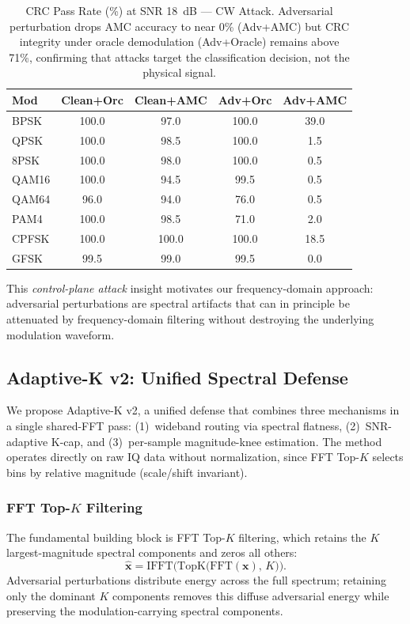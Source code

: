 \begin{table}[t]
\caption{CRC Pass Rate (\%) at SNR 18~dB --- CW Attack. Adversarial
  perturbation drops AMC accuracy to near 0\% (Adv+AMC) but CRC integrity
  under oracle demodulation (Adv+Oracle) remains above 71\%, confirming
  that attacks target the classification decision, not the physical signal.}
\label{tab:crc}
\centering
\small
\begin{tabular}{lcccc}
\toprule
Mod & Clean+Orc & Clean+AMC & Adv+Orc & Adv+AMC \\
\midrule
BPSK  & 100.0 & 97.0 & 100.0 & 39.0 \\
QPSK  & 100.0 & 98.5 & 100.0 &  1.5 \\
8PSK  & 100.0 & 98.0 & 100.0 &  0.5 \\
QAM16 & 100.0 & 94.5 &  99.5 &  0.5 \\
QAM64 &  96.0 & 94.0 &  76.0 &  0.5 \\
PAM4  & 100.0 & 98.5 &  71.0 &  2.0 \\
CPFSK & 100.0 & 100.0 & 100.0 & 18.5 \\
GFSK  &  99.5 & 99.0 &  99.5 &  0.0 \\
\bottomrule
\end{tabular}
\end{table}

This \emph{control-plane attack} insight motivates our frequency-domain
approach: adversarial perturbations are spectral artifacts that can in principle
be attenuated by frequency-domain filtering without destroying the underlying
modulation waveform.

\subsection{Adaptive-K v2: Unified Spectral Defense}
\label{sec:adaptivek}

We propose Adaptive-K v2, a unified defense that combines three mechanisms
in a single shared-FFT pass: (1)~wideband routing via spectral flatness,
(2)~SNR-adaptive K-cap, and (3)~per-sample magnitude-knee estimation.
The method operates directly on raw IQ data without normalization, since
FFT Top-$K$ selects bins by relative magnitude (scale/shift invariant).

\subsubsection{FFT Top-$K$ Filtering}

The fundamental building block is FFT Top-$K$ filtering, which retains
the $K$ largest-magnitude spectral components and zeros all others:
\begin{equation}
  \hat{\mathbf{x}} = \text{IFFT}\!\bigl(\mathrm{TopK}\bigl(\text{FFT}(\mathbf{x}),\, K\bigr)\bigr).
  \label{eq:topk}
\end{equation}
Adversarial perturbations distribute energy across the full spectrum;
retaining only the dominant $K$ components removes this diffuse adversarial
energy while preserving the modulation-carrying spectral components.

